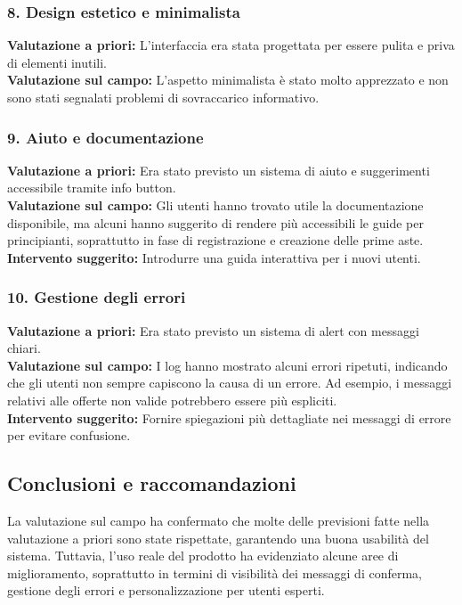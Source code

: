 \subsubsection{8. Design estetico e minimalista}
\textbf{Valutazione a priori:} L'interfaccia era stata progettata per essere pulita e priva di elementi inutili.\\
\textbf{Valutazione sul campo:} L'aspetto minimalista è stato molto apprezzato e non sono stati segnalati problemi di sovraccarico informativo.

\subsubsection{9. Aiuto e documentazione}
\textbf{Valutazione a priori:} Era stato previsto un sistema di aiuto e suggerimenti accessibile tramite info button.\\
\textbf{Valutazione sul campo:} Gli utenti hanno trovato utile la documentazione disponibile, ma alcuni hanno suggerito di rendere più accessibili le guide per principianti, soprattutto in fase di registrazione e creazione delle prime aste.\\
\textbf{Intervento suggerito:} Introdurre una guida interattiva per i nuovi utenti.

\subsubsection{10. Gestione degli errori}
\textbf{Valutazione a priori:} Era stato previsto un sistema di alert con messaggi chiari.\\
\textbf{Valutazione sul campo:} I log hanno mostrato alcuni errori ripetuti, indicando che gli utenti non sempre capiscono la causa di un errore. Ad esempio, i messaggi relativi alle offerte non valide potrebbero essere più espliciti.\\
\textbf{Intervento suggerito:} Fornire spiegazioni più dettagliate nei messaggi di errore per evitare confusione.

\subsection{Conclusioni e raccomandazioni}

La valutazione sul campo ha confermato che molte delle previsioni fatte nella valutazione a priori sono state rispettate, garantendo una buona usabilità del sistema. Tuttavia, l'uso reale del prodotto ha evidenziato alcune aree di miglioramento, soprattutto in termini di visibilità dei messaggi di conferma, gestione degli errori e personalizzazione per utenti esperti.

